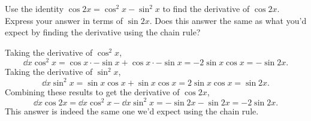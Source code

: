 \begin{example}
	Use the identity $\cos{2x} = \cos^2{x} - \sin^2{x}$ to find the derivative of $\cos{2x}$. Express your answer in terms of $\sin{2x}$. Does this answer the same as what you'd expect by finding the derivative using the chain rule?
\end{example}
Taking the derivative of $\cos^2{x}$,
\begin{equation*}
	\dd{}{x}\cos^2{x} = \cos{x}\cdot-\sin{x} + \cos{x}\cdot-\sin{x} = -2\sin{x}\cos{x} = -\sin{2x}.
\end{equation*}
\indent
Taking the derivative of $\sin^2{x}$,
\begin{equation*}
	\dd{}{x}\sin^2{x} = \sin{x}\cos{x} + \sin{x}\cos{x} = 2\sin{x}\cos{x} = \sin{2x}.
\end{equation*}
\indent
Combining these results to get the derivative of $\cos{2x}$,
\begin{equation*}
	\dd{}{x}\cos{2x} = \dd{}{x}\cos^2{x} - \dd{}{x}\sin^2{x} = -\sin{2x} - \sin{2x} = -2\sin{2x}.
\end{equation*}
\indent
This answer is indeed the same one we'd expect using the chain rule.